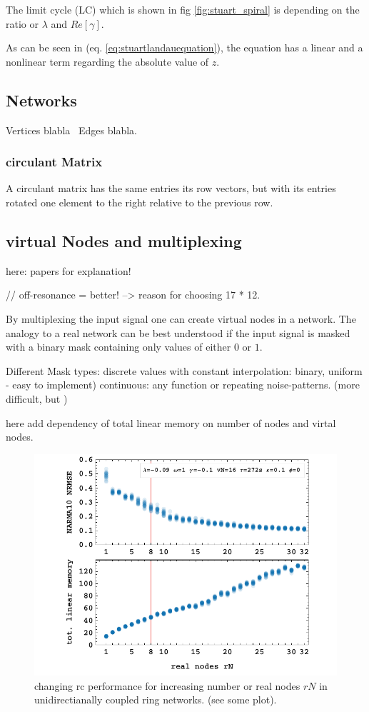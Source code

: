 The limit cycle (LC) which is shown in fig \ref{fig:stuart_spiral} is depending on the ratio or $\lambda$ and $Re \left[\gamma \right]$.





As can be seen in (eq. \ref{eq:stuartlandauequation}), the equation has a linear and a nonlinear term regarding the absolute value of $z$.

\subsection{Networks}

Vertices blabla \
Edges blabla. \

	\subsubsection{circulant Matrix}
    A circulant matrix has the same entries its row vectors, but with its entries rotated one element to the right relative to the previous row.
    
\subsection{virtual Nodes and multiplexing}
	here: papers for explanation! 
	\cite{KUR18}
	
	\cite{STE20} // off-resonance = better! --> reason for choosing 17 * 12.
	
	By multiplexing the input signal one can create virtual nodes in a network. The analogy to a real network can be best understood if the input signal is masked with a binary mask containing only values of either $0$ or $1$. 
	
	Different Mask types: discrete values with constant interpolation: binary, uniform - easy to implement)
	continuous: any function or repeating noise-patterns. (more difficult, but )
	
	
	here add dependency of total linear memory on number of nodes and virtal nodes.
	
	
	\begin{figure}
		\centering
		\includegraphics[width=0.9\linewidth]{pics/rNplot}
		\caption{changing rc performance for increasing number or real nodes $rN$ in unidirectianally coupled ring networks. (see some plot).}
		\label{fig:rN_1-32}
	\end{figure}

